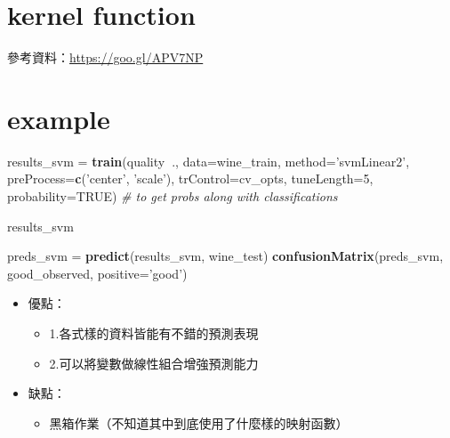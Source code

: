 \documentclass[]{book}
\newenvironment{Shaded}{\begin{snugshade}}{\end{snugshade}}
\newcommand{\KeywordTok}[1]{\textcolor[rgb]{0.13,0.29,0.53}{\textbf{#1}}}
\newcommand{\DataTypeTok}[1]{\textcolor[rgb]{0.13,0.29,0.53}{#1}}
\newcommand{\DecValTok}[1]{\textcolor[rgb]{0.00,0.00,0.81}{#1}}
\newcommand{\StringTok}[1]{\textcolor[rgb]{0.31,0.60,0.02}{#1}}
\newcommand{\CommentTok}[1]{\textcolor[rgb]{0.56,0.35,0.01}{\textit{#1}}}
\newcommand{\OtherTok}[1]{\textcolor[rgb]{0.56,0.35,0.01}{#1}}
\newcommand{\OperatorTok}[1]{\textcolor[rgb]{0.81,0.36,0.00}{\textbf{#1}}}
\newcommand{\NormalTok}[1]{#1}
\providecommand{\tightlist}{%
  \setlength{\itemsep}{0pt}\setlength{\parskip}{0pt}}
\begin{document}
\hypertarget{kernel-function-1}{%
\section{kernel function}\label{kernel-function-1}}

參考資料：\url{https://goo.gl/APV7NP}

\hypertarget{example}{%
\section{example}\label{example}}

\begin{Shaded}
\begin{Highlighting}[]
\NormalTok{results_svm =}\StringTok{ }\KeywordTok{train}\NormalTok{(quality}\OperatorTok{~}\NormalTok{., }
                    \DataTypeTok{data=}\NormalTok{wine_train, }
                    \DataTypeTok{method=}\StringTok{'svmLinear2'}\NormalTok{,}
                    \DataTypeTok{preProcess=}\KeywordTok{c}\NormalTok{(}\StringTok{'center'}\NormalTok{, }\StringTok{'scale'}\NormalTok{), }
                    \DataTypeTok{trControl=}\NormalTok{cv_opts, }
                    \DataTypeTok{tuneLength=}\DecValTok{5}\NormalTok{,}
                    \DataTypeTok{probability=}\OtherTok{TRUE}\NormalTok{)  }\CommentTok{# to get probs along with classifications}

\NormalTok{results_svm}
\end{Highlighting}
\end{Shaded}

\begin{Shaded}
\begin{Highlighting}[]
\NormalTok{preds_svm =}\StringTok{ }\KeywordTok{predict}\NormalTok{(results_svm, wine_test)}
\KeywordTok{confusionMatrix}\NormalTok{(preds_svm, good_observed, }\DataTypeTok{positive=}\StringTok{'good'}\NormalTok{)}
\end{Highlighting}
\end{Shaded}

\begin{itemize}
\tightlist
\item
  優點：

  \begin{itemize}
  \tightlist
  \item
    1.各式樣的資料皆能有不錯的預測表現
  \item
    2.可以將變數做線性組合增強預測能力
  \end{itemize}
\item
  缺點：

  \begin{itemize}
  \tightlist
  \item
    黑箱作業（不知道其中到底使用了什麼樣的映射函數）
  \end{itemize}
\end{itemize}


\end{document}
